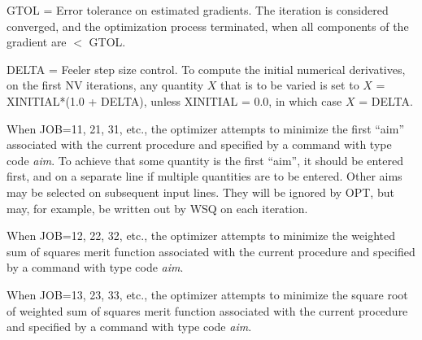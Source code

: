 	 GTOL =  Error tolerance on estimated gradients.  The iteration is
	 considered converged, \hspace*{6.15em}and the optimization
	 process terminated, when all components of the gradient \hspace*{6.15em}are $<$ GTOL.

	 DELTA = Feeler step size control.  To compute the initial numerical
	 derivatives, on the \hspace*{6.15em}first NV iterations, any quantity $X$ that is to be
	 varied is set to $X$ = \\
	 \hspace*{6.15em}XINITIAL*(1.0 + DELTA), unless XINITIAL = 0.0,
	 in which case $X$ = \hspace*{6.15em}DELTA.
\vspace{2mm}
\vspace{2mm}

      When JOB=11, 21, 31, etc., the optimizer attempts to minimize the
	  first ``aim'' associated with the current procedure and specified by
	  a command with type code {\em aim}.  To achieve that some quantity is the first ``aim'', it should
be entered first, and on a separate line if multiple quantities are to be
entered.  Other aims may be selected on subsequent input lines.  They
will be ignored by OPT, but may, for example, be written out by WSQ on
each iteration.

When JOB=12, 22, 32, etc., the optimizer attempts to minimize the
weighted sum of squares merit function associated with the current
procedure and specified by a command with type code {\em aim}.

When JOB=13, 23, 33, etc., the optimizer attempts to minimize the square
root of weighted sum of squares merit function associated with the
current procedure and specified by a command with type code {\em aim}.

\newpage
